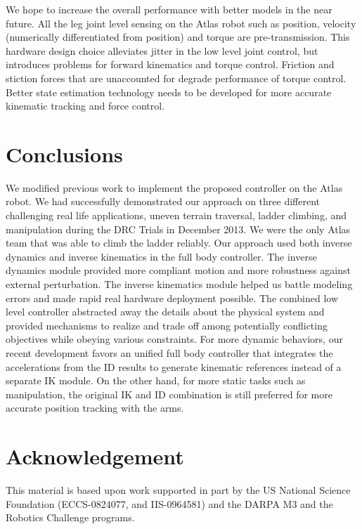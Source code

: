 \documentclass{ws-ijhr}
\begin{document}
We hope to increase the overall performance with better models in the near future. 
All the leg joint level sensing on the Atlas robot such as position, velocity 
(numerically differentiated from position) and torque are pre-transmission. 
This hardware design choice alleviates jitter in the low level joint control, 
but introduces problems for forward kinematics and torque control. 
Friction and stiction forces that are unaccounted for degrade performance of torque control. 
Better state estimation technology needs to be developed for more accurate 
kinematic tracking and force control. 



\section{Conclusions}
\label{sec:conclusion}
We modified previous work to implement the proposed controller on the Atlas 
robot. We had successfully demonstrated our approach on three different challenging 
real life applications, uneven terrain traversal, ladder climbing, and 
manipulation during the DRC Trials in December 2013. 
We were the only Atlas team that was able to climb the ladder reliably.  
Our approach used both inverse dynamics and inverse kinematics in the full body 
controller. 
The inverse dynamics module provided more compliant motion and more robustness 
against external perturbation. 
The inverse kinematics module helped us battle modeling errors and made rapid 
real hardware deployment possible.
The combined low level controller abstracted away the details about the physical 
system and provided mechanisms to realize and trade off among potentially 
conflicting objectives while obeying various constraints. 
For more dynamic behaviors, our recent development favors an unified full body
controller that integrates the accelerations from the ID results to generate 
kinematic references instead of a separate IK module.
On the other hand, for more static tasks such as manipulation, the original 
IK and ID combination is still preferred for more accurate position tracking with
the arms.
 

\section*{Acknowledgement}
This material is based upon work supported in part by the US National Science 
Foundation (ECCS-0824077, and IIS-0964581) and the DARPA M3 and the Robotics 
Challenge programs.
 



\end{document}
